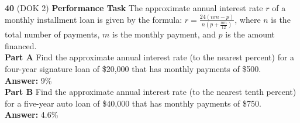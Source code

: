 \documentclass{article}
\newenvironment{practice}[2]{\textbf{#1} (DOK #2)}{}
\newcommand{\answer}[1]{\textbf{Answer:} #1}
\begin{document}
\begin{practice}{40}{2}
\textbf{Performance Task} The approximate annual interest rate $r$ of a monthly installment loan is given by the formula:
$r = \frac{24(nm - p)}{n\left(p + \frac{nm}{12}\right)}$,
where $n$ is the total number of payments, $m$ is the monthly payment, and $p$ is the amount financed. \\
\textbf{Part A} Find the approximate annual interest rate (to the nearest percent) for a four-year signature loan of \$20,000 that has monthly payments of \$500. \\
\answer{9\%} \\
\textbf{Part B} Find the approximate annual interest rate (to the nearest tenth percent) for a five-year auto loan of \$40,000 that has monthly payments of \$750. \\
\answer{4.6\%}
\end{practice}
\end{document}
